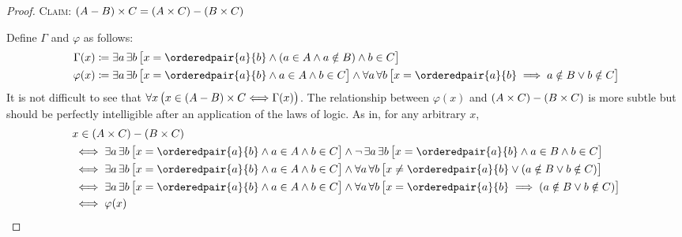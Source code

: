 \begin{proof}
    \vspace{0.5cm}
    \noindent
    {\scshape Claim}: \( \mleft( A - B \mright) \times C = \mleft( A \times C \mright) - \mleft( B \times C \mright) \)

    \vspace{0.1cm}
    \noindent
    Define \( \Gamma \) and \( \varphi \) as follows:
    \begin{align*}
        \Gamma(x)
        &\coloneq
        \exists a \, \exists b \, \big[ x = \orderedpair{a}{b} \land \mleft( a \in A \land a \notin B \mright) \land b \in C \big] \\
        \varphi(x)
        &\coloneq
        \exists a \, \exists b \, \big[ x = \orderedpair{a}{b} \land a \in A \land b \in C \big]
        \land
        \forall a \, \forall b \, \big[ x = \orderedpair{a}{b} \implies a \notin B \lor b \notin C \big]
    \end{align*}
    It is not difficult to see that \( \forall x \, \big( x \in \mleft( A - B \mright) \times C {\iff} \Gamma(x) \big) \). The relationship between
    \( \varphi(x) \) and \( \mleft( A \times C \mright) - \mleft( B \times C \mright) \) is more subtle but should be perfectly intelligible after
    an application of the laws of logic. As in, for any arbitrary \( x \),
    \begin{equation*}
        \begin{split}
            &x \in \mleft( A \times C \mright) - \mleft( B \times C \mright)\\
            &\iff \exists a \, \exists b \, \big[ x = \orderedpair{a}{b} \land a \in A \land b \in C \big]
            \land \lnot \,
            \exists a \, \exists b \, \big[ x = \orderedpair{a}{b} \land a \in B \land b \in C \big] \\
            &\iff
            \exists a \, \exists b \, \big[ x = \orderedpair{a}{b} \land a \in A \land b \in C \big]
            \land
            \forall a \, \forall b \, \big[ x \neq \orderedpair{a}{b} \lor \mleft( a \notin B \lor b \notin C \mright) \big]\\
            &\iff
            \exists a \, \exists b \, \big[ x = \orderedpair{a}{b} \land a \in A \land b \in C \big]
            \land
            \forall a \, \forall b \, \big[ x = \orderedpair{a}{b} \implies \mleft( a \notin B \lor b \notin C \mright) \big]\\
            &\iff
            \varphi(x)
        \end{split}
    \end{equation*}

\end{proof}
